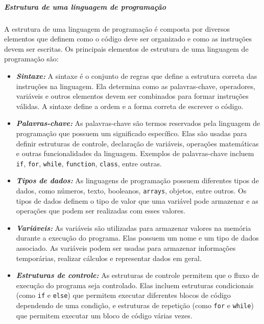 \documentclass[a4paper, 12pt, onecolumn,singlespacing]{article}
\begin{document}
	\subparagraph{Estrutura de uma linguagem de programação} \label{estrutura_da_linguagem_de_programacao} A estrutura de uma linguagem de programação é composta por diversos elementos que definem como o código deve ser organizado e como as instruções devem ser escritas. Os principais elementos de estrutura de uma linguagem de programação são:
	
	\begin{itemize}
		\item \textbf{\textit{Sintaxe:}} A sintaxe é o conjunto de regras que define a estrutura correta das instruções na linguagem. Ela determina como as palavras-chave, operadores, variáveis e outros elementos devem ser combinados para formar instruções válidas. A sintaxe define a ordem e a forma correta de escrever o código.
		
		\item \textbf{\textit{Palavras-chave:}} As palavras-chave são termos reservados pela linguagem de programação que possuem um significado específico. Elas são usadas para definir estruturas de controle, declaração de variáveis, operações matemáticas e outras funcionalidades da linguagem. Exemplos de palavras-chave incluem \texttt{if}, \texttt{for}, \texttt{while}, \texttt{function}, \texttt{class}, entre outras.
		
		\item \textbf{\textit{Tipos de dados:}} As linguagens de programação possuem diferentes tipos de dados, como números, texto, booleanos, \texttt{arrays}, objetos, entre outros. Os tipos de dados definem o tipo de valor que uma variável pode armazenar e as operações que podem ser realizadas com esses valores.
		
		\item \textbf{\textit{Variáveis:}} As variáveis são utilizadas para armazenar valores na memória durante a execução do programa. Elas possuem um nome e um tipo de dados associado. As variáveis podem ser usadas para armazenar informações temporárias, realizar cálculos e representar dados em geral.
		
		\item \textbf{\textit{Estruturas de controle:}} As estruturas de controle permitem que o fluxo de execução do programa seja controlado. Elas incluem estruturas condicionais (como \texttt{if} e \texttt{else}) que permitem executar diferentes blocos de código dependendo de uma condição, e estruturas de repetição (como \texttt{for} e \texttt{while}) que permitem executar um bloco de código várias vezes.
		

\end{itemize}
\end{document}
